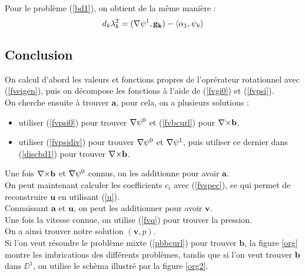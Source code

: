 Pour le problème (\ref{bd1}), on obtient de la même manière :
\begin{equation}
\label{discbd1}
d_k\lambda_k^2 = ({\nabla}\psi^1,\mathbf{g_k}) - \langle\alpha_1,\psi_k\rangle
\end{equation}

\subsection{Conclusion}

On calcul d'abord les valeurs et fonctions propres de l'oprérateur rotationnel avec (\ref{fveigen}), puis on décompose les fonctions à l'aide de (\ref{fvgi0}) et (\ref{fvpsi}).\\
On cherche ensuite à trouver $\mathbf{a}$, pour cela, on a plusieurs solutions :
\begin{itemize}
\item utiliser (\ref{fvpsi0}) pour trouver ${\nabla}\psi^0$  et (\ref{fvbcurl}) pour ${\nabla\times} \mathbf{b}$.
\item utiliser (\ref{fvpsidiv}) pour trouver ${\nabla}\psi^0$ et ${\nabla}\psi^1$, puis utiliser ce dernier dans (\ref{discbd1}) pour trouver ${\nabla\times} \mathbf{b}$.
\end{itemize}
Une fois ${\nabla\times} \mathbf{b}$ et ${\nabla}\psi^0$ connus, on les additionne pour avoir $\mathbf{a}$.\\
On peut maintenant calculer les coefficients $c_i$ avec (\ref{fvspec}), ce qui permet de reconstruire $\mathbf{u}$ en utilisant (\ref{u}).\\
Connaissant $\mathbf{a}$ et $\mathbf{u}$, on peut les additionner pour avoir $\mathbf{v}$.\\
Une fois la vitesse connue, on utilise (\ref{fvq}) pour trouver la pression.\\

On a ainsi trouver notre solution $(\mathbf{v},p)$.\\
Si l'on veut résoudre le problème mixte (\ref{pbbcurl}) pour trouver $\mathbf{b}$, la figure \ref{org} montre les imbrications des différents problèmes, tandis que si l'on veut trouver $\mathbf{b}$ dans $\DD^1$, on utilise le schèma illustré par la figure \ref{org2}.\\

